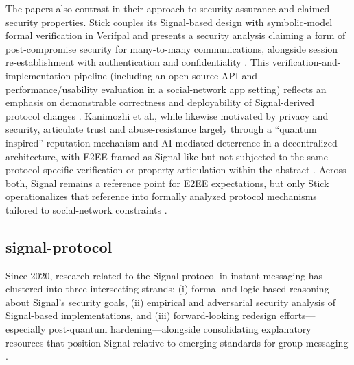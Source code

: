 The papers also contrast in their approach to security assurance and claimed security properties. Stick couples its Signal-based design with symbolic-model formal verification in Verifpal and presents a security analysis claiming a form of post-compromise security for many-to-many communications, alongside session re-establishment with authentication and confidentiality \cite{basem2023}. This verification-and-implementation pipeline (including an open-source API and performance/usability evaluation in a social-network app setting) reflects an emphasis on demonstrable correctness and deployability of Signal-derived protocol changes \cite{basem2023}. Kanimozhi et al., while likewise motivated by privacy and security, articulate trust and abuse-resistance largely through a ``quantum inspired'' reputation mechanism and AI-mediated deterrence in a decentralized architecture, with E2EE framed as Signal-like but not subjected to the same protocol-specific verification or property articulation within the abstract \cite{kanimozhi2025}. Across both, Signal remains a reference point for E2EE expectations, but only Stick operationalizes that reference into formally analyzed protocol mechanisms tailored to social-network constraints \cite{basem2023,kanimozhi2025}.

\subsection{signal-protocol}
Since 2020, research related to the Signal protocol in instant messaging has clustered into three intersecting strands: (i) formal and logic-based reasoning about Signal’s security goals, (ii) empirical and adversarial security analysis of Signal-based implementations, and (iii) forward-looking redesign efforts—especially post-quantum hardening—alongside consolidating explanatory resources that position Signal relative to emerging standards for group messaging \cite{oppliger2020,kamkuemah2021,jain2021,sharma2023,oppliger2024,boras2025,angom2025}.

